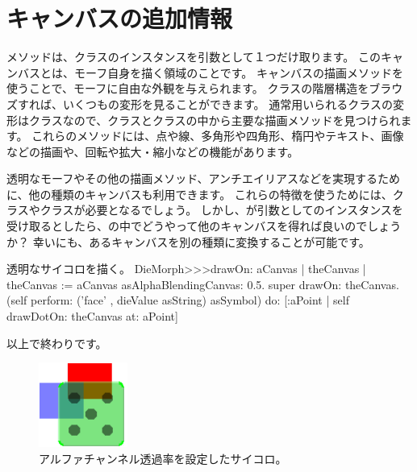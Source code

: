 \documentclass[a4paper,10pt,twoside]{book}
\begin{document}


\section{キャンバスの追加情報}

メソッドは、クラスのインスタンスを引数として１つだけ取ります。
このキャンバスとは、モーフ自身を描く領域のことです。
キャンバスの描画メソッドを使うことで、モーフに自由な外観を与えられます。
クラスの階層構造をブラウズすれば、いくつもの変形を見ることができます。
通常用いられるクラスの変形はクラスなので、クラスとクラスの中から主要な描画メソッドを見つけられます。
これらのメソッドには、点や線、多角形や四角形、楕円やテキスト、画像などの描画や、回転や拡大・縮小などの機能があります。

透明なモーフやその他の描画メソッド、アンチエイリアスなどを実現するために、他の種類のキャンバスも利用できます。
これらの特徴を使うためには、クラスやクラスが必要となるでしょう。
しかし、が引数としてのインスタンスを受け取るとしたら、の中でどうやって他のキャンバスを得れば良いのでしょうか？
幸いにも、あるキャンバスを別の種類に変換することが可能です。

\begin{method}{透明なサイコロを描く。}
DieMorph>>>drawOn: aCanvas
	| theCanvas |
	theCanvas := aCanvas asAlphaBlendingCanvas: 0.5.
	super drawOn: theCanvas.
	(self perform: ('face' , dieValue asString) asSymbol)
		do: [:aPoint | self drawDotOn: theCanvas at: aPoint]
\end{method}
\noindent
以上で終わりです。

\begin{figure}[ht]
	\centerline{\includegraphics[scale=0.7]{multiMorphs}}
	\caption{アルファチャンネル透過率を設定したサイコロ。
		}
\end{figure}
\end{document}
